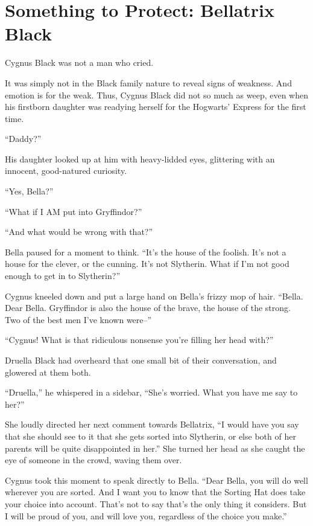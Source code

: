 \chapter{Something to Protect: Bellatrix Black}


Cygnus Black was not a man who cried.

It was simply not in the Black family nature to reveal signs of weakness. And emotion is for the weak. Thus, Cygnus Black did not so much as weep, even when his firstborn daughter was readying herself for the Hogwarts’ Express for the first time.

“Daddy?”

His daughter looked up at him with heavy-lidded eyes, glittering with an innocent, good-natured curiosity.

“Yes, Bella?”

“What if I AM put into Gryffindor?”

“And what would be wrong with that?”

Bella paused for a moment to think. “It’s the house of the foolish. It’s not a house for the clever, or the cunning. It’s not Slytherin. What if I’m not good enough to get in to Slytherin?”

Cygnus kneeled down and put a large hand on Bella’s frizzy mop of hair. “Bella. Dear Bella. Gryffindor is also the house of the brave, the house of the strong. Two of the best men I’ve known were–”

“Cygnus! What is that ridiculous nonsense you’re filling her head with?”

Druella Black had overheard that one small bit of their conversation, and glowered at them both.

“Druella,” he whispered in a sidebar, “She’s worried. What you have me say to her?”

She loudly directed her next comment towards Bellatrix, “I would have you say that she should see to it that she gets sorted into Slytherin, or else both of her parents will be quite disappointed in her.” She turned her head as she caught the eye of someone in the crowd, waving them over.

Cygnus took this moment to speak directly to Bella. “Dear Bella, you will do well wherever you are sorted. And I want you to know that the Sorting Hat does take your choice into account. That’s not to say that’s the only thing it considers. But I will be proud of you, and will love you, regardless of the choice you make.”

